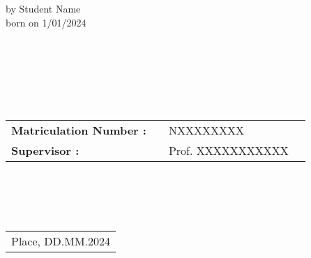 \thispagestyle{empty}

\begin{center}
\doublespacing
\textbf{\LARGE{\subjectDocument}}\\
\singlespacing
\begin{verbatim}


\end{verbatim}
{\large\affiliationDocument}
\begin{verbatim}

\end{verbatim}
{\large\degreeDocument}
\end{center}
\begin{verbatim}




\end{verbatim}
\begin{center}
{\large{by Student Name \\ born on 1/01/2024}}
\end{center}
\begin{verbatim}







\end{verbatim}
\begin{flushleft}
\begin{tabular}{llll}
\textbf{Matriculation Number :} & & NXXXXXXXX & \\
\textbf{Supervisor   :} & & Prof. XXXXXXXXXXX &\\
\end{tabular}
\begin{verbatim}



  
\end{verbatim}
\begin{tabular}{l}
Place, DD.MM.2024
\end{tabular}
\end{flushleft}
